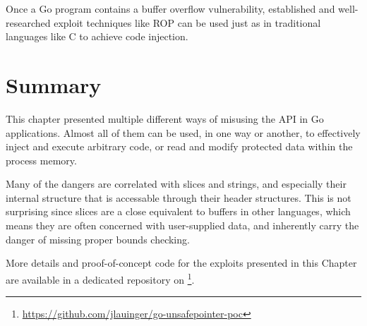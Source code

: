 \begin{insight}
    Once a Go program contains a buffer overflow vulnerability, established and well-researched exploit techniques like
    \acrshort{ROP} can be used just as in traditional languages like C to achieve code injection.
\end{insight}



\section{Summary}\label{sec:unsafe-security-problems:summary}

This chapter presented multiple different ways of misusing the \unsafe{} \acrshort{API} in Go applications.
Almost all of them can be used, in one way or another, to effectively inject and execute arbitrary code, or read and
modify protected data within the process memory.

Many of the dangers are correlated with slices and strings, and especially their internal structure that is accessable
through their header structures.
This is not surprising since slices are a close equivalent to buffers in other languages, which means they are often
concerned with user-supplied data, and inherently carry the danger of missing proper bounds checking.

More details and proof-of-concept code for the exploits presented in this Chapter are available in a dedicated
repository on \github{}\footnote{\url{https://github.com/jlauinger/go-unsafepointer-poc}}.

